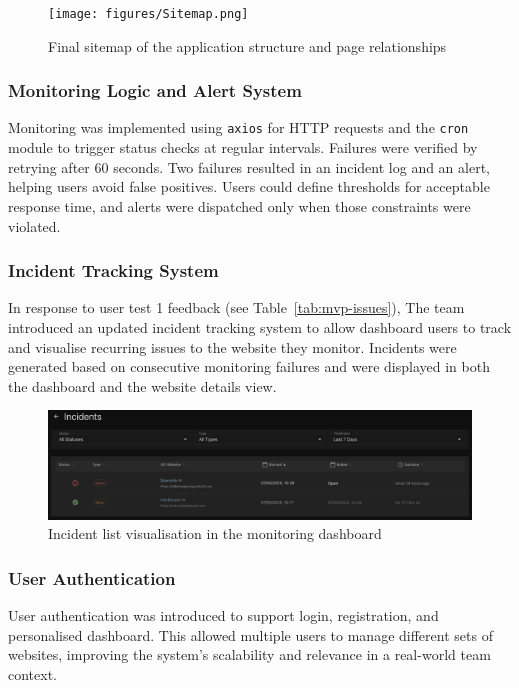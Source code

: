 \begin{figure}[H]
\centering
\texttt{[image: figures/Sitemap.png]}
\caption{Final sitemap of the application structure and page relationships}
\label{fig:sitemap_final}
\end{figure}

\subsubsection{Monitoring Logic and Alert System}
Monitoring was implemented using \texttt{axios} for HTTP requests and the \texttt{cron} module to trigger status checks at regular intervals. Failures were verified by retrying after 60 seconds. Two  failures resulted in an incident log and an alert, helping users avoid false positives. Users could define thresholds for acceptable response time, and alerts were dispatched only when those constraints were violated. 

\subsubsection{Incident Tracking System}
In response to user test 1 feedback (see Table~\ref{tab:mvp-issues}), The team introduced an updated incident tracking system to allow dashboard users to track and visualise recurring issues to the website they monitor. Incidents were generated based on consecutive monitoring failures and were displayed in both the dashboard and the website details view.

\begin{figure}[H]
\centering
\includegraphics[width=1\textwidth]{figures/IncidentList.png}
\caption{Incident list visualisation in the monitoring dashboard}
\label{fig:incident_list}
\end{figure}

\subsubsection{User Authentication}
User authentication was introduced to support login, registration, and personalised dashboard. This allowed multiple users to manage different sets of websites, improving the system’s scalability and relevance in a real-world team context.

